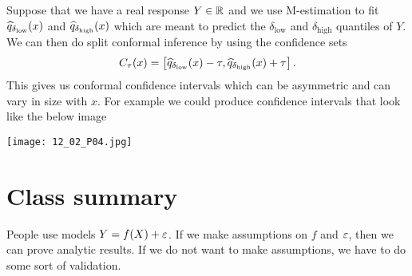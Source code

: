 \begin{ex}[Etude 4]
    Suppose that we have a real response $Y\in {\mathbb R}$ and we use M-estimation to fit $\widehat{q}_{\delta_{\text{low}}}(x)$ and $\widehat{q}_{\delta_{\text{high}}}(x)$ which are meant to predict the $\delta_{\text{low}}$ and $\delta_{\text{high}}$ quantiles of $Y$. We can then do split conformal inference by using the confidence sets
    \[C_\tau(x) = \left[\widehat{q}_{\delta_{\text{low}}}(x)-\tau,\widehat{q}_{\delta_{\text{high}}}(x)+\tau\right]. \]
    This gives us conformal confidence intervals which can be asymmetric and can vary in size with $x$. For example we could produce confidence intervals that look like the below image
    \begin{center}
        \texttt{[image: 12\_02\_P04.jpg]}
    \end{center}
\end{ex}
\section{Class summary}
People use models $Y=f(X) + \varepsilon$. If we make assumptions on $f$ and $\varepsilon$, then we can prove analytic results. If we do not want to make assumptions, we have to do some sort of validation.
